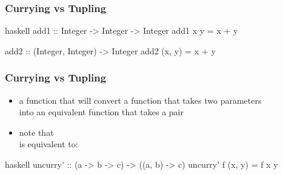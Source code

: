 \documentclass[dvipsnames]{beamer}
\theoremstyle{plain}
\begin{document}
\begin{frame}[fragile]
  \frametitle{Currying vs Tupling}

  \begin{exampleblock}{}
    \begin{pygments}{haskell}
add1 :: Integer -> Integer -> Integer
add1 x y = x + y

add2 :: (Integer, Integer) -> Integer
add2 (x, y) = x + y
    \end{pygments}
  \end{exampleblock}
\end{frame}

\begin{frame}[fragile]
  \frametitle{Currying vs Tupling}

  \begin{itemize}
    \item a function that will convert a function that takes two parameters\\
      into an equivalent function that takes a pair
  \end{itemize}

  \begin{exampleblock}{}
  \end{exampleblock}

  \pause
  \begin{itemize}
    \item note that \\
      is equivalent to: 
  \end{itemize}

  \begin{exampleblock}{}
    \begin{pygments}{haskell}
uncurry' :: (a -> b -> c) -> ((a, b) -> c)
uncurry' f (x, y) = f x y
    \end{pygments}
  \end{exampleblock}
\end{frame}
\end{document}
